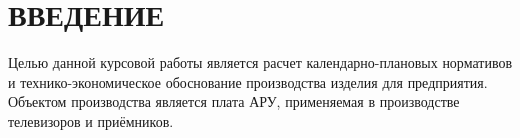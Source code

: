 \section*{ВВЕДЕНИЕ}

Целью данной курсовой работы является расчет календарно-плановых нормативов
и технико-экономическое обоснование производства изделия для предприятия.
Объектом производства является плата АРУ, применяемая в производстве
телевизоров и приёмников.
